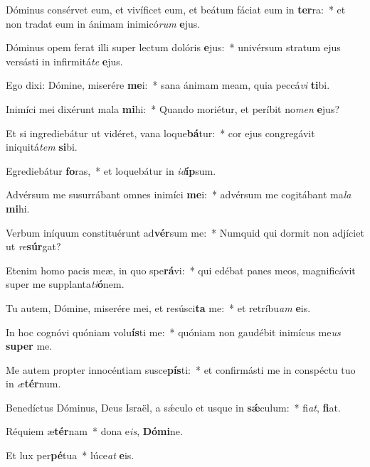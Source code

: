 \item Dóminus consérvet eum, et vivíficet eum, et beátum fáciat eum in \textbf{ter}ra:~* et non tradat eum in ánimam inimicó\textit{rum} \textbf{e}jus.

\item Dóminus opem ferat illi super lectum dolóris \textbf{e}jus:~* univérsum stratum ejus versásti in infirmitá\textit{te} \textbf{e}jus.

\item Ego dixi: Dómine, miserére \textbf{me}i:~* sana ánimam meam, quia peccá\textit{vi} \textbf{ti}bi.

\item Inimíci mei dixérunt mala \textbf{mi}hi:~* Quando moriétur, et períbit no\textit{men} \textbf{e}jus?

\item Et si ingrediebátur ut vidéret, vana loque\textbf{bá}tur:~* cor ejus congregávit iniquitá\textit{tem} \textbf{si}bi.

\item Egrediebátur \textbf{fo}ras,~* et loquebátur in \textit{id}\textbf{íp}sum.

\item Advérsum me susurrábant omnes inimíci \textbf{me}i:~* advérsum me cogitábant ma\textit{la} \textbf{mi}hi.

\item Verbum iníquum constituérunt ad\textbf{vér}sum me:~* Numquid qui dormit non adjíciet ut \textit{re}\textbf{súr}gat?

\item Etenim homo pacis meæ, in quo spe\textbf{rá}vi:~* qui edébat panes meos, magnificávit super me supplanta\textit{ti}\textbf{ó}nem.

\item Tu autem, Dómine, miserére mei, et resúsci\textbf{ta} me:~* et retríbu\textit{am} \textbf{e}is.

\item In hoc cognóvi quóniam volu\textbf{ís}ti me:~* quóniam non gaudébit inimícus me\textit{us} \textbf{su}\textbf{per} me.

\item Me autem propter innocéntiam susce\textbf{pís}ti:~* et confirmásti me in conspéctu tuo in \textit{æ}\textbf{tér}num.

\item Benedíctus Dóminus, Deus Israël, a sǽculo et usque in \textbf{sǽ}culum:~* fi\textit{at}, \textbf{fi}at.

\item Réquiem æ\textbf{tér}nam~* dona e\textit{is}, \textbf{Dó}\textbf{mi}ne.

\item Et lux per\textbf{pé}tua~* lúce\textit{at} \textbf{e}is.